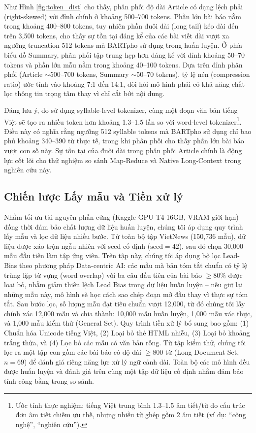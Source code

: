 \documentclass{article}
\begin{document}
Như Hình \ref{fig:token_dist} cho thấy, phân phối độ dài Article có dạng lệch phải (right-skewed) với đỉnh chính ở khoảng 500--700 tokens. Phần lớn bài báo nằm trong khoảng 400--800 tokens, tuy nhiên phần đuôi dài (long tail) kéo dài đến trên 3,500 tokens, cho thấy sự tồn tại đáng kể của các bài viết dài vượt xa ngưỡng truncation 512 tokens mà BARTpho sử dụng trong huấn luyện. Ở phía biểu đồ Summary, phân phối tập trung hẹp hơn đáng kể với đỉnh khoảng 50--70 tokens và phần lớn mẫu nằm trong khoảng 40--100 tokens. Dựa trên đỉnh phân phối (Article $\sim$500--700 tokens, Summary $\sim$50--70 tokens), tỷ lệ nén (compression ratio) ước tính vào khoảng 7:1 đến 14:1, đòi hỏi mô hình phải có khả năng chắt lọc thông tin trọng tâm thay vì chỉ cắt bớt nội dung.

Đáng lưu ý, do sử dụng syllable-level tokenizer, cùng một đoạn văn bản tiếng Việt sẽ tạo ra nhiều token hơn khoảng 1.3--1.5 lần so với word-level tokenizer\footnote{Ước tính thực nghiệm: tiếng Việt trung bình 1.3--1.5 âm tiết/từ do cấu trúc đơn âm tiết chiếm ưu thế, nhưng nhiều từ ghép gồm 2 âm tiết (ví dụ: ``công nghệ'', ``nghiên cứu'').}. Điều này có nghĩa rằng ngưỡng 512 syllable tokens mà BARTpho sử dụng chỉ bao phủ khoảng 340--390 từ thực tế, trong khi phân phối cho thấy phần lớn bài báo vượt con số này. Sự tồn tại của đuôi dài trong phân phối Article chính là động lực cốt lõi cho thử nghiệm so sánh Map-Reduce và Native Long-Context trong nghiên cứu này.

\subsection{Chiến lược Lấy mẫu và Tiền xử lý}
Nhằm tối ưu tài nguyên phần cứng (Kaggle GPU T4 16GB, VRAM giới hạn) đồng thời đảm bảo chất lượng dữ liệu huấn luyện, chúng tôi áp dụng quy trình lấy mẫu và lọc dữ liệu nhiều bước. Từ toàn bộ tập VietNews (150,736 mẫu), dữ liệu được xáo trộn ngẫu nhiên với seed cố định ($\text{seed} = 42$), sau đó chọn 30,000 mẫu đầu tiên làm tập ứng viên. Trên tập này, chúng tôi áp dụng bộ lọc Lead-Bias theo phương pháp Data-centric AI: các mẫu mà bản tóm tắt chuẩn có tỷ lệ trùng lặp từ vựng (word overlap) với ba câu đầu tiên của bài báo $\geq 80\%$ được loại bỏ, nhằm giảm thiên lệch Lead Bias trong dữ liệu huấn luyện -- nếu giữ lại những mẫu này, mô hình sẽ học cách sao chép đoạn mở đầu thay vì thực sự tóm tắt. Sau bước lọc, số lượng mẫu đạt tiêu chuẩn vượt 12,000, từ đó chúng tôi lấy chính xác 12,000 mẫu và chia thành: 10,000 mẫu huấn luyện, 1,000 mẫu xác thực, và 1,000 mẫu kiểm thử (General Set). Quy trình tiền xử lý bổ sung bao gồm: (1) Chuẩn hóa Unicode tiếng Việt, (2) Loại bỏ thẻ HTML nhiễu, (3) Loại bỏ khoảng trắng thừa, và (4) Lọc bỏ các mẫu có văn bản rỗng. Từ tập kiểm thử, chúng tôi lọc ra một tập con gồm các bài báo có độ dài $\geq 800$ từ (Long Document Set, $n = 69$) để đánh giá riêng năng lực xử lý ngữ cảnh dài. Toàn bộ các mô hình đều được huấn luyện và đánh giá trên cùng một tập dữ liệu cố định nhằm đảm bảo tính công bằng trong so sánh.
\end{document}
